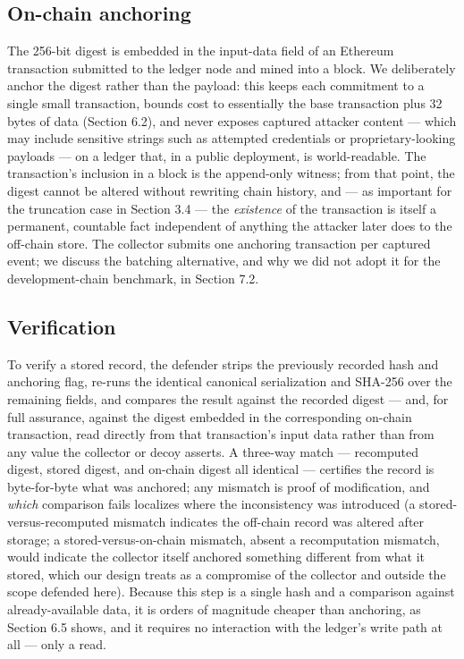 \documentclass[journal]{IEEEtran}
\begin{document}
\subsection{On-chain anchoring}

The 256-bit digest is embedded in the input-data field of an Ethereum transaction submitted to the ledger node and mined into a block. We deliberately anchor the digest rather than the payload: this keeps each commitment to a single small transaction, bounds cost to essentially the base transaction plus 32 bytes of data (Section 6.2), and never exposes captured attacker content --- which may include sensitive strings such as attempted credentials or proprietary-looking payloads --- on a ledger that, in a public deployment, is world-readable. The transaction's inclusion in a block is the append-only witness; from that point, the digest cannot be altered without rewriting chain history, and --- as important for the truncation case in Section 3.4 --- the \emph{existence} of the transaction is itself a permanent, countable fact independent of anything the attacker later does to the off-chain store. The collector submits one anchoring transaction per captured event; we discuss the batching alternative, and why we did not adopt it for the development-chain benchmark, in Section 7.2.

\subsection{Verification}

To verify a stored record, the defender strips the previously recorded hash and anchoring flag, re-runs the identical canonical serialization and SHA-256 over the remaining fields, and compares the result against the recorded digest --- and, for full assurance, against the digest embedded in the corresponding on-chain transaction, read directly from that transaction's input data rather than from any value the collector or decoy asserts. A three-way match --- recomputed digest, stored digest, and on-chain digest all identical --- certifies the record is byte-for-byte what was anchored; any mismatch is proof of modification, and \emph{which} comparison fails localizes where the inconsistency was introduced (a stored-versus-recomputed mismatch indicates the off-chain record was altered after storage; a stored-versus-on-chain mismatch, absent a recomputation mismatch, would indicate the collector itself anchored something different from what it stored, which our design treats as a compromise of the collector and outside the scope defended here). Because this step is a single hash and a comparison against already-available data, it is orders of magnitude cheaper than anchoring, as Section 6.5 shows, and it requires no interaction with the ledger's write path at all --- only a read.
\end{document}
